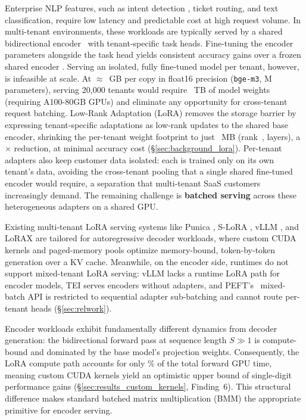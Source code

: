 \documentclass[11pt]{article}
\begin{document}
Enterprise NLP features, such as intent detection \cite{arora2024intent}, ticket routing,
and text classification, require low latency and predictable cost at
high request volume.
In multi-tenant environments, these workloads are typically served by a
shared bidirectional encoder~\cite{devlin2019bert} with tenant-specific task heads.
Fine-tuning the encoder parameters alongside the task head
yields consistent accuracy gains over a frozen shared encoder
\cite{tunstall2022efficient,jain2026succeeding}.
Serving an isolated, fully fine-tuned model per tenant, however, is
infeasible at scale.
At $\approx$\BgeFpSixteenGB{}~GB per copy in float16 precision
(\texttt{bge-m3}, \BgeParamsM{}M parameters), serving
20{,}000 tenants would require \StorageTwentyKTB{}~TB of model
weights (requiring \StorageTwentyKGPUs{} A100-80GB GPUs) and eliminate any
opportunity for cross-tenant request batching.
Low-Rank Adaptation (LoRA) \cite{hu2022lora} removes the storage barrier
by expressing tenant-specific adaptations as low-rank updates to the
shared base encoder, shrinking the per-tenant weight footprint to just
\LoraBytesREightMB{}~MB (rank~\HeadlineRank{}, \BgeLayers{} layers), a
\StorageReductionFullVsLoraRankEight$\times$ reduction, at minimal accuracy
cost (\S\ref{sec:background_lora}).
Per-tenant adapters also keep customer data isolated: each is trained only on
its own tenant's data, avoiding the cross-tenant pooling that a single shared
fine-tuned encoder would require, a separation that multi-tenant SaaS customers
increasingly demand.
The remaining challenge is \textbf{batched serving} across these
heterogeneous adapters on a shared GPU.

Existing multi-tenant LoRA serving systems like Punica
\cite{chen2024punica}, S-LoRA \cite{sheng2024slora}, vLLM
\cite{kwon2023vllm}, and LoRAX \cite{predibase2023lorax} are tailored
for autoregressive decoder workloads, where custom CUDA kernels and
paged-memory pools optimize memory-bound, token-by-token generation
over a KV cache.
Meanwhile, on the encoder side, runtimes do not support mixed-tenant
LoRA serving: vLLM lacks a runtime LoRA path for encoder models, TEI \cite{huggingface2023tei}
serves encoders without adapters, and PEFT's~\cite{mangrulkar2022peft} mixed-batch API is
restricted to sequential adapter sub-batching and cannot route
per-tenant heads (\S\ref{sec:relwork}).

Encoder workloads exhibit fundamentally different dynamics from
decoder generation: the bidirectional forward pass at sequence length $S \gg 1$
is compute-bound and dominated by the base model's projection weights.
Consequently, the LoRA compute path accounts for only
\AblationLoraCostPct{}\% of the total forward GPU time, meaning
custom CUDA kernels yield an optimistic upper bound of single-digit performance gains
(\S\ref{sec:results_custom_kernels}, Finding~6).
This structural difference makes standard batched matrix
multiplication (BMM) the appropriate primitive for encoder serving.
\end{document}
